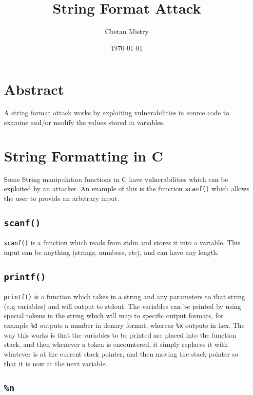 \documentclass[11pt]{article}
\author{Chetan Mistry}
\date{\today}
\title{String Format Attack}
\begin{document}
\maketitle
\tableofcontents


\section{Abstract}
\label{sec:org39fae9d}

A string format attack works by exploiting vulnerabilities in source
code to examine and/or modify the values stored in variables.


\section{String Formatting in C}
\label{sec:org9ec0dda}

Some String manipulation functions in C have vulnerabilities which can
be exploited by an attacker. An example of this is the function
\texttt{scanf()} which allows the user to provide an arbitrary input.

\subsection{\texttt{scanf()}}
\label{sec:org6b6c3f6}

\texttt{scanf()} is a function which reads from stdin and stores it into a
variable. This input can be anything (strings, numbers, etc), and can
have any length.

\subsection{\texttt{printf()}}
\label{sec:org2b33583}

\texttt{printf()} is a function which takes in a string and any parameters to
that string (e.g variables) and will output to stdout. The variables
can be printed by using special tokens in the string which will map to
specific output formats, for example \texttt{\%d} outputs a number in denary
format, whereas \texttt{\%x} outputs in hex. The way this works is that the
variables to be printed are placed into the function stack, and then
whenever a token is encountered, it simply replaces it with whatever
is at the current stack pointer, and then moving the stack pointer so
that it is now at the next variable.

\subsection{\texttt{\%n}}
\label{sec:org2d92dc5}
\end{document}
